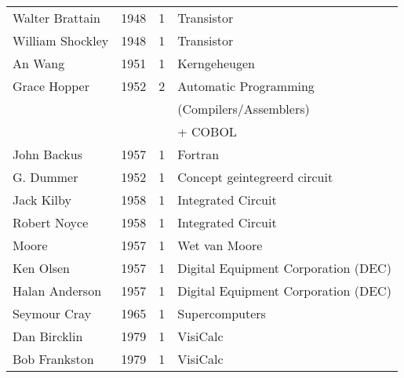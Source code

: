 \documentclass[../main.tex]{subfiles}
\begin{document}
\begin{longtable}{llll}
Walter Brattain			&	1948		&	1		&	Transistor	\\
William Shockley		&	1948		&	1		&	Transistor	\\
An Wang					&	1951		&	1		&	Kerngeheugen	\\
Grace Hopper			&	1952		&	2		&	Automatic Programming \\
					 	&				&			&	(Compilers/Assemblers)	\\
					 	&				&			&	+ COBOL \\
John Backus				&	1957		&	1		&	Fortran	\\
G. Dummer				&	1952		&	1		&	Concept geintegreerd circuit	\\
Jack Kilby				&	1958		&	1		&	Integrated Circuit	\\
Robert Noyce			&	1958		&	1		&	Integrated Circuit	\\
Moore					&	1957		&	1		&	Wet van Moore	\\
Ken Olsen				&	1957		&	1		&	Digital Equipment Corporation (DEC)	\\
Halan Anderson			&	1957		&	1		&	Digital Equipment Corporation (DEC)	\\
Seymour Cray			&	1965		&	1		&	Supercomputers	\\
Dan Bircklin			&	1979		&	1		&	VisiCalc	\\
Bob Frankston			&	1979		&	1		&	VisiCalc	\\
\end{longtable}
\end{document}
